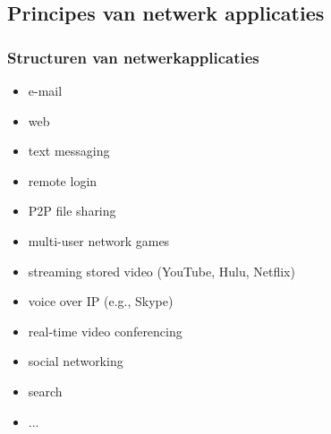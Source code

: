 \subsection{Principes van netwerk applicaties}

\subsubsection{Structuren van netwerkapplicaties}

\begin{multicols}{2}
  \begin{itemize}
      \item e-mail
 \item web
 \item text messaging
 \item remote login
 \item P2P file sharing
 \item multi-user network games
 \item streaming stored video (YouTube, Hulu, Netflix)
 \item voice over IP (e.g., Skype)
 \item real-time video conferencing
 \item social networking
 \item search
 \item ...
  \end{itemize}
\end{multicols}

